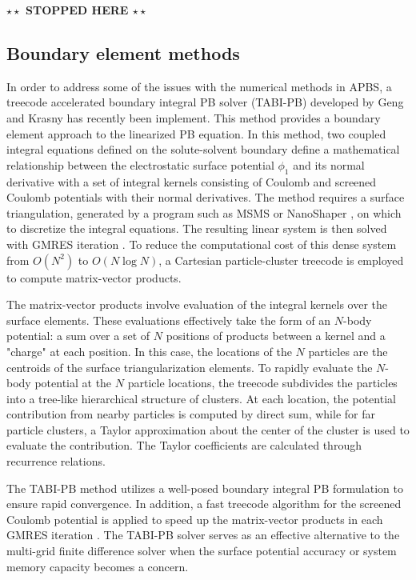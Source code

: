 \documentclass[11pt,titlepage]{article}
\newcommand{\todo}[1]{\textbf{$\star \star$ {#1} $\star \star$}}
\begin{document}
\todo{STOPPED HERE}

\subsection{Boundary element methods}
In order to address some of the issues with the numerical methods in APBS, a treecode accelerated boundary integral PB solver (TABI-PB) developed by Geng and Krasny \cite{geng2013} has recently been implement. This method provides a boundary element approach to the linearized PB equation. In this method, two coupled integral equations defined on the solute-solvent boundary define a mathematical relationship between the electrostatic surface potential $\phi_1$ and its normal derivative with a set of integral kernels consisting of Coulomb and screened Coulomb potentials with their normal derivatives. The method requires a surface triangulation, generated by a program such as MSMS \cite{sanner1995} or NanoShaper \cite{decherchi2013}, on which to discretize the integral equations. The resulting linear system is then solved with GMRES iteration \cite{saad1986}. To reduce the computational cost of this dense system from $O(N^2)$ to $O(N\log N)$, a Cartesian particle-cluster treecode is employed to compute matrix-vector products.

The matrix-vector products involve evaluation of the integral kernels over the surface elements. These evaluations effectively take the form of an $N$-body potential: a sum over a set of $N$ positions of products between a kernel and a "charge" at each position. In this case, the locations of the $N$ particles are the centroids of the surface triangularization elements. To rapidly evaluate the $N$-body potential at the $N$ particle locations, the treecode subdivides the particles into a tree-like hierarchical structure of clusters. At each location, the potential contribution from nearby particles is computed by direct sum, while for far particle clusters, a Taylor approximation about the center of the cluster is used to evaluate the contribution. The Taylor coefficients are calculated through recurrence relations. 

The TABI-PB method utilizes a well-posed boundary integral PB formulation to ensure rapid convergence. In addition, a fast treecode algorithm for the screened Coulomb potential \cite{Li2009} is applied to speed up the matrix-vector products in each GMRES iteration \cite{Juffer1991}. The TABI-PB solver serves as an effective alternative to the multi-grid finite difference solver when the surface potential accuracy or system memory capacity becomes a concern.
\end{document}
